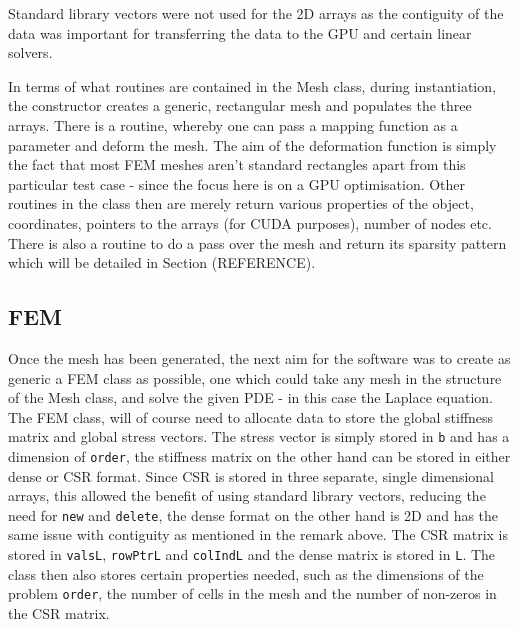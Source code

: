 \begin{remark}
	Standard library vectors were not used for the 2D arrays as the contiguity of the data was important for transferring the data to the GPU and certain linear solvers.
\end{remark}

In terms of what routines are contained in the Mesh class, during instantiation, the constructor creates a generic, rectangular mesh and populates the three arrays. There is a routine, whereby one can pass a mapping function as a parameter and deform the mesh. The aim of the deformation function is simply the fact that most FEM meshes aren't standard rectangles apart from this particular test case - since the focus here is on a GPU optimisation. Other routines in the class then are merely return various properties of the object, coordinates, pointers to the arrays (for CUDA purposes), number of nodes etc. There is also a routine to do a pass over the mesh and return its sparsity pattern which will be detailed in Section (REFERENCE).

\subsection{FEM}

Once the mesh has been generated, the next aim for the software was to create as generic a FEM class as possible, one which could take any mesh in the structure of the Mesh class, and solve the given PDE - in this case the Laplace equation. The FEM class, will of course need to allocate data to store the global stiffness matrix and global stress vectors. The stress vector is simply stored in \texttt{b} and has a dimension of \texttt{order}, the stiffness matrix on the other hand can be stored in either dense or CSR format. Since CSR is stored in three separate, single dimensional arrays, this allowed the benefit of using standard library vectors, reducing the need for \texttt{new} and \texttt{delete}, the dense format on the other hand is 2D and has the same issue with contiguity as mentioned in the remark above. The CSR matrix is stored in \texttt{valsL}, \texttt{rowPtrL} and \texttt{colIndL} and the dense matrix is stored in \texttt{L}. The class then also stores certain properties needed, such as the dimensions of the problem \texttt{order}, the number of cells in the mesh and the number of non-zeros in the CSR matrix.

